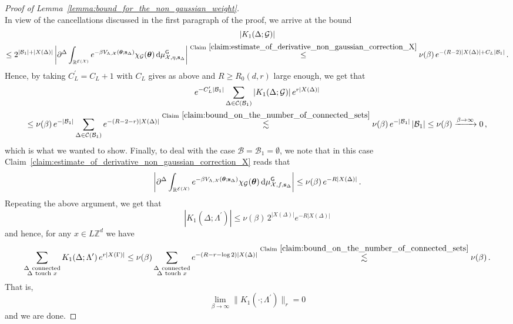 \documentclass[11pt]{article}
\theoremstyle{definition}
\theoremstyle{remark}
\numberwithin{theorem}{section}
\def\La{{\Lambda}}
\def\Ga{{\Gamma}}
\newcommand{\bR}{\mathbb R}
\newcommand{\bZ}{\mathbb Z}
\newcommand{\cE}{\mathcal{E}}
\begin{document}
\begin{proof}[Proof of Lemma~\ref{lemma:bound_for_the_non_gaussian_weight}]
\[        \]
        In view of the cancellations discussed in the first paragraph of the proof, we arrive at the bound 
        \begin{multline*}
        |K_1(\Delta;\mathcal{G})| \\ \le 2^{|\mathcal{B}_1| + |X(\Delta)|} \,  \bigg| \partial^\Delta \int_{\bR^{\cE(\mathcal{X})}} e^{-\beta V_{\Lambda,\mathcal{X}}(\boldsymbol{\theta};\mathbf{s}_\Delta)} \chi_{\mathcal{G}}(\boldsymbol{\theta}) \, {\rm d}\mu_{\mathcal{X},\eta,\mathbf{s}_\Delta}^{\sf G} \bigg|   \stackrel{\text{Claim}~\ref{claim:estimate_of_derivative_non_gaussian_correction_X}}{\le}  \nu(\beta) \,  e^{-(R-2)|X(\Delta)| + C_L |\mathcal{B}_1|} \, .    
        \end{multline*}
        Hence, by taking $C_L^\prime = C_L + 1$ with $C_L$ gives as above and $R\ge R_0(d,r)$ large enough, we get that
        \begin{multline*}
             e^{-C_L^\prime|\mathcal{B}_1|}\sum_{\Delta\in \mathcal{C}(\mathcal{B}_1 ) } |K_1(\Delta;\mathcal{G})| \,  e^{r|X(\Delta)|} \\ \le \nu(\beta) \,  e^{-|\mathcal{B}_1|} \sum_{\Delta\in \mathcal{C}(\mathcal{B}_1)} e^{-(R-2 - r)|X(\Delta)|}   \stackrel{\text{Claim}~\ref{claim:bound_on_the_number_of_connected_sets}}{\lesssim } \nu(\beta) \, e^{-|\mathcal{B}_1|} \, |\mathcal{B}_1| \le \nu(\beta) \xrightarrow{\beta\to\infty} 0 \, ,
        \end{multline*}
        which is what we wanted to show. Finally, to deal with the case $\mathcal{B} = \mathcal{B}_1 = \emptyset$, we note that in this case Claim~\ref{claim:estimate_of_derivative_non_gaussian_correction_X} reads that
        \[
        \bigg| \partial^\Delta \int_{\bR^{\cE(\mathcal{X})}} e^{-\beta V_{\Lambda,\mathcal{X}}(\boldsymbol{\theta};\mathbf{s}_\Delta)} \chi_{\mathcal{G}}(\boldsymbol{\theta}) \, {\rm d}\mu_{\mathcal{X},f,\mathbf{s}_\Delta}^{\sf G} \bigg| \le \nu(\beta) \, e^{-R|X(\Delta)|} \, .
        \]
        Repeating the above argument, we get that
        \[
        |K_1(\Delta; \La^\prime)| \le \nu(\beta) \, 2^{|X(\Delta)|} e^{-R|X(\Delta)|} 
        \]
        and hence, for any $x\in L\bZ^d$ we have 
        \[
        \sum_{\substack{\Delta \ \text{connected} \\ \Delta \  \text{touch } x }} K_1(\Delta;\La^\prime) \,  e^{r|X(\Ga)|}  \le \nu(\beta) \sum_{\substack{\Delta \ \text{connected} \\ \Delta \  \text{touch } x }} e^{-(R-r-\log 2) |X(\Delta)|} \stackrel{\text{Claim}~\ref{claim:bound_on_the_number_of_connected_sets}}{\lesssim } \nu(\beta) \, .
        \]
        That is,
        \[
        \lim_{\beta\to \infty} \| K_1(\cdot; \La^\prime) \|_r = 0
        \]
        and we are done. 
    \end{proof}
    
\end{document}
